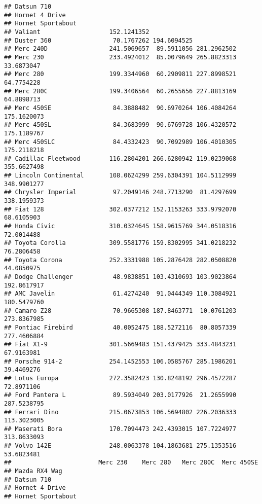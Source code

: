 \documentclass[]{book}
\begin{document}
\begin{verbatim}
## Datsun 710                                                               
## Hornet 4 Drive                                                           
## Hornet Sportabout                                                        
## Valiant                   152.1241352                                    
## Duster 360                 70.1767262 194.6094525                        
## Merc 240D                 241.5069657  89.5911056 281.2962502            
## Merc 230                  233.4924012  85.0079649 265.8823313  33.6873047
## Merc 280                  199.3344960  60.2909811 227.8998521  64.7754228
## Merc 280C                 199.3406564  60.2655656 227.8813169  64.8898713
## Merc 450SE                 84.3888482  90.6970264 106.4084264 175.1620073
## Merc 450SL                 84.3683999  90.6769728 106.4320572 175.1189767
## Merc 450SLC                84.4332423  90.7092989 106.4010305 175.2118218
## Cadillac Fleetwood        116.2804201 266.6280942 119.0239068 355.6627498
## Lincoln Continental       108.0624299 259.6304391 104.5112999 348.9901277
## Chrysler Imperial          97.2049146 248.7713290  81.4297699 338.1959373
## Fiat 128                  302.0377212 152.1153263 333.9792070  68.6105903
## Honda Civic               310.0324645 158.9615769 344.0518316  72.0014488
## Toyota Corolla            309.5581776 159.8302995 341.0218232  76.2806458
## Toyota Corona             252.3331988 105.2876428 282.0508820  44.0850975
## Dodge Challenger           48.9838851 103.4310693 103.9023864 192.8617917
## AMC Javelin                61.4274240  91.0444349 110.3084921 180.5479760
## Camaro Z28                 70.9665308 187.8463771  10.0761203 273.8367985
## Pontiac Firebird           40.0052475 188.5272116  80.8057339 277.4606884
## Fiat X1-9                 301.5669483 151.4379425 333.4843231  67.9163981
## Porsche 914-2             254.1452553 106.0585767 285.1986201  39.4469276
## Lotus Europa              272.3582423 130.8248192 296.4572287  72.8971106
## Ford Pantera L             89.5934049 203.0177926  21.2655990 287.5238795
## Ferrari Dino              215.0673853 106.5694802 226.2036333 113.3023005
## Maserati Bora             170.7094473 242.4393015 107.7224977 313.8633093
## Volvo 142E                248.0063378 104.1863681 275.1353516  53.6823481
##                        Merc 230    Merc 280   Merc 280C  Merc 450SE
## Mazda RX4 Wag                                                      
## Datsun 710                                                         
## Hornet 4 Drive                                                     
## Hornet Sportabout                                                  

\end{verbatim}
\end{document}
